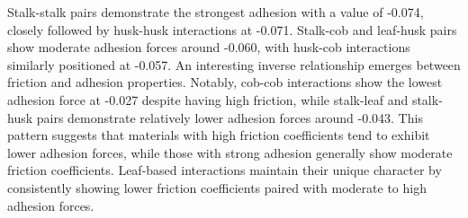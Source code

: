 \documentclass[xcolor=dvipsnames,10pt,hidelinks]{article}
\begin{document}
Stalk-stalk pairs demonstrate the strongest adhesion with a value of -0.074, closely followed by husk-husk interactions at -0.071.
Stalk-cob and leaf-husk pairs show moderate adhesion forces around -0.060, with husk-cob interactions similarly positioned at -0.057.
An interesting inverse relationship emerges between friction and adhesion properties. Notably, cob-cob interactions show the lowest adhesion force at -0.027 despite having high friction, while stalk-leaf and stalk-husk pairs demonstrate relatively lower adhesion forces around -0.043. This pattern suggests that materials with high friction coefficients tend to exhibit lower adhesion forces, while those with strong adhesion generally show moderate friction coefficients. Leaf-based interactions maintain their unique character by consistently showing lower friction coefficients paired with moderate to high adhesion forces.
\end{document}
